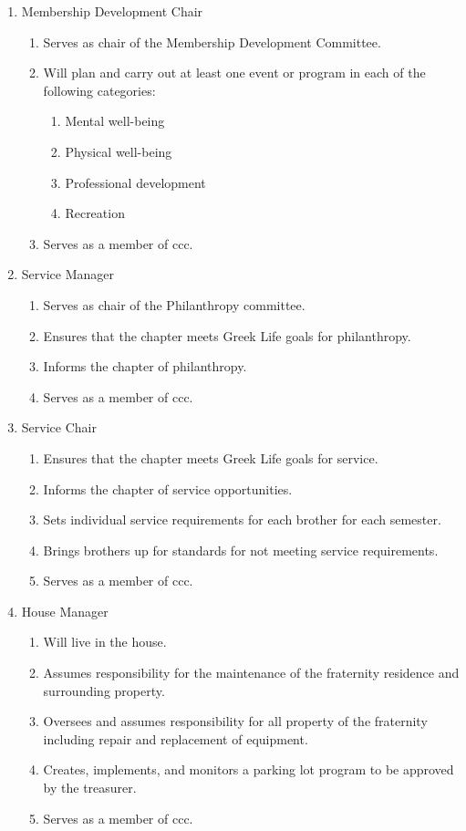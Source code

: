 \begin{enumerate}
		\item Membership Development Chair
			\begin{enumerate}
				\item  Serves as chair of the Membership Development Committee.
				\item Will plan and carry out at least one event or program in each of the following categories:
					\begin{enumerate}
						\item Mental well-being
						\item Physical well-being
						\item Professional development
						\item Recreation
					\end{enumerate}
				\item Serves as a member of \gls{ccc}.
			\end{enumerate}

		\item Service Manager
			\begin{enumerate}
				\item Serves as chair of the Philanthropy committee.
				\item Ensures that the chapter meets Greek Life goals for philanthropy.
				\item Informs the chapter of philanthropy.
				\item Serves as a member of \gls{ccc}.
			\end{enumerate}

		\item Service Chair
			\begin{enumerate}
				\item Ensures that the chapter meets Greek Life goals for service.
				\item Informs the chapter of service opportunities.
				\item Sets individual service requirements for each brother for each semester.
				\item Brings brothers up for standards for not meeting service requirements.
				\item Serves as a member of \gls{ccc}.
			\end{enumerate}

		\item House Manager
			\begin{enumerate}
				\item Will live in the house.
				\item Assumes responsibility for the maintenance of the fraternity residence and surrounding property.
				\item Oversees and assumes responsibility for all property of the fraternity including repair and replacement of equipment.
				\item Creates, implements, and monitors a parking lot program to be approved by the treasurer.
				\item Serves as a member of \gls{ccc}.
			\end{enumerate}


\end{enumerate}
